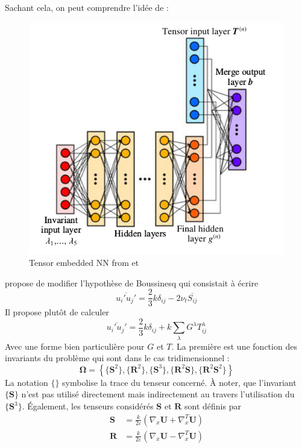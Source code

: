 \documentclass[a4paper,12pt]{report}
\numberwithin{equation}{section} %
\begin{document}
\noindent Sachant cela, on peut comprendre l'idée de \textbf{\textit{\cite{ling2016reynolds}}} :

\begin{figure}[!ht]
\centering
\includegraphics[scale=0.5]{TBNN.png}
\caption{Tensor embedded NN from \citep{kutz2017deep} et \citep{ling2016reynolds}}
\label{TBNN}
\end{figure}
 
\noindent \cite{pope1975more} propose de modifier l'hypothèse de Boussinesq qui consistait à écrire 
\begin{equation*}
\overline{u_i' u_j'} = \frac{2}{3} k \delta_{ij} - 2 \nu_t \overline{S_{ij}}
\end{equation*}
 Il propose plutôt de calculer 
\begin{equation*}
\overline{u_i' u_j'} = \frac{2}{3} k \delta_{ij} + k\sum_\lambda G^\lambda T^\lambda_{ij} 
\end{equation*}
Avec une forme bien particulière pour $G$ et $T$. La première est une fonction des invariants du problème qui sont dans le cas tridimensionnel : 
\begin{equation*}
\mathbf{\Omega}= \left \{ \{\textbf{S}^2\}, \{\textbf{R}^2\}, \{\textbf{S}^3\}, \{\textbf{R}^2\textbf{S}\}, \{\textbf{R}^2 \textbf{S}^2\}\right \} 
\end{equation*}
La notation $\{ \}$ symbolise la trace du tenseur concerné. À noter, que l'invariant $\{\textbf{S}\}$ n'est pas utilisé directement mais indirectement au travers l'utilisation du $\{\textbf{S}^3\}$. Également, les tenseurs considérés $\textbf{S}$ et $\textbf{R}$ sont définis par 
\begin{align*}
\textbf{S} &= \frac{k}{2\varepsilon}\left(\nabla_x\textbf{U} + \nabla^T_x\textbf{U} \right) \\[0.2cm]
\textbf{R} &= \frac{k}{2 \varepsilon}\left(\nabla_x\textbf{U} - \nabla^T_x\textbf{U} \right) 
\end{align*}
\end{document}
